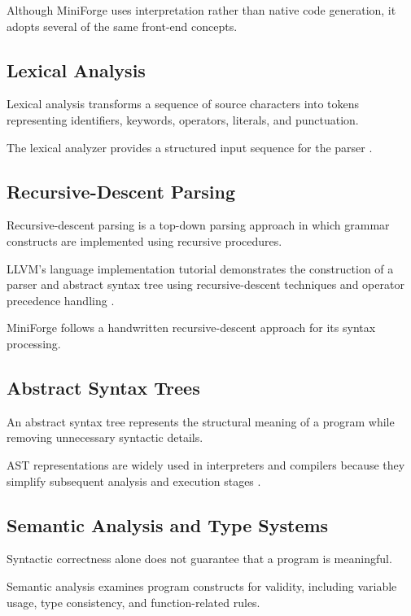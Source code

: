 \documentclass[conference]{IEEEtran}
\begin{document}
Although MiniForge uses interpretation rather than
native code generation, it adopts several of the
same front-end concepts.

\subsection{Lexical Analysis}

Lexical analysis transforms a sequence of source
characters into tokens representing identifiers,
keywords, operators, literals, and punctuation.

The lexical analyzer provides a structured input
sequence for the parser \cite{aho,crafting}.

\subsection{Recursive-Descent Parsing}

Recursive-descent parsing is a top-down parsing
approach in which grammar constructs are implemented
using recursive procedures.

LLVM's language implementation tutorial demonstrates
the construction of a parser and abstract syntax tree
using recursive-descent techniques and operator
precedence handling \cite{llvm}.

MiniForge follows a handwritten recursive-descent
approach for its syntax processing.

\subsection{Abstract Syntax Trees}

An abstract syntax tree represents the structural
meaning of a program while removing unnecessary
syntactic details.

AST representations are widely used in interpreters
and compilers because they simplify subsequent
analysis and execution stages \cite{aho,crafting}.

\subsection{Semantic Analysis and Type Systems}

Syntactic correctness alone does not guarantee that
a program is meaningful.

Semantic analysis examines program constructs for
validity, including variable usage, type consistency,
and function-related rules.
\end{document}
